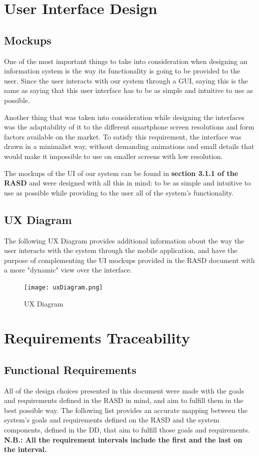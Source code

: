 \documentclass[12pt]{article}
\begin{document}
\section{User Interface Design}
\subsection{Mockups}
One of the most important things to take into consideration when designing an information system is the way its functionality is going to be provided to the user. Since the user interacts with our system through a GUI, saying this is the same as saying that this user interface has to be as simple and intuitive to use as possible.

Another thing that was taken into consideration while designing the interfaces was the adaptability of it to the different smartphone screen resolutions and form factors available on the market. To satisfy this requirement, the interface was drawn in a minimalist way, without demanding animations and small details that would make it impossible to use on smaller screens with low resolution.

The mockups of the UI of our system can be found in \textbf{section 3.1.1 of the RASD} and were designed with all this in mind: to be as simple and intuitive to use as possible while providing to the user all of the system's functionality.
\subsection{UX Diagram}
The following UX Diagram provides additional information about the way the user interacts with the system through the mobile application, and have the purpose of complementing the UI mockups provided in the RASD document with a more "dynamic" view over the interface.

\begin{figure}[H]
    \centering
    \texttt{[image: uxDiagram.png]}
    \caption{UX Diagram}
    \label{fig:uxDiagram}
\end{figure}

\section{Requirements Traceability}
\subsection{Functional Requirements}
All of the design choices presented in this document were made with the goals and requirements defined in the RASD in mind, and aim to fulfill them in the best possible way. The following list provides an accurate mapping between the system's goals and requirements defined on the RASD and the system components, defined in the DD, that aim to fulfill those goals and requirements.\\
\textbf{N.B.: All the requirement intervals include the first and the last on the interval.}
\end{document}
